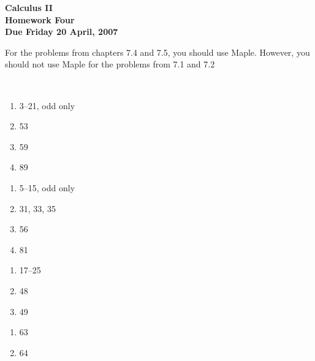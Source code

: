 \documentclass[12pt]{article}
\begin{document}
\pagestyle{empty}
 
\begin{center}
{\large {\bf Calculus II}}\\
\medskip
{\large {\bf Homework Four}}\\
\medskip
{ {\bf Due Friday 20 April, 2007}}\\
\end{center}

For the problems from chapters 7.4 and 7.5, you should use Maple.
However, you should not use Maple for the problems from 7.1 and 7.2  

\hspace{2mm}\\


\begin{enumerate}
\setlength{\itemsep}{-1mm}
  \item 3--21, odd only
  \item 53
  \item 59
  \item 89

\end{enumerate}


\begin{enumerate}
\setlength{\itemsep}{-1mm}
  \item 5--15, odd only
  \item 31, 33, 35
  \item 56
  \item 81
\end{enumerate}



\begin{enumerate}
\setlength{\itemsep}{-1mm}
  \item 17--25
  \item 48
  \item 49

\end{enumerate}



\begin{enumerate}
\setlength{\itemsep}{-1mm}
  \item 63
  \item 64

\end{enumerate}
\end{document}
